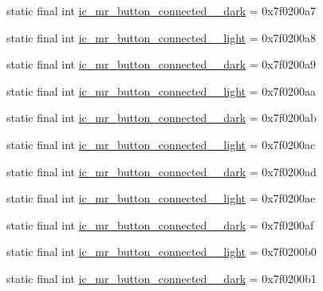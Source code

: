 \begin{CompactItemize}
\item 
static final int \hyperlink{classandroid_1_1support_1_1v7_1_1recyclerview_1_1_r_1_1drawable_499abbf786df938d6fa821ca68df2c3b}{ic\_\-mr\_\-button\_\-connected\_\_\-dark} = 0x7f0200a7
\item 
static final int \hyperlink{classandroid_1_1support_1_1v7_1_1recyclerview_1_1_r_1_1drawable_ec6d9b101cf9909231258707a5fa4ee5}{ic\_\-mr\_\-button\_\-connected\_\_\-light} = 0x7f0200a8
\item 
static final int \hyperlink{classandroid_1_1support_1_1v7_1_1recyclerview_1_1_r_1_1drawable_d05229da8974e09ac5083b489d43a212}{ic\_\-mr\_\-button\_\-connected\_\_\-dark} = 0x7f0200a9
\item 
static final int \hyperlink{classandroid_1_1support_1_1v7_1_1recyclerview_1_1_r_1_1drawable_901356fae4838928b40b6b1602799e2d}{ic\_\-mr\_\-button\_\-connected\_\_\-light} = 0x7f0200aa
\item 
static final int \hyperlink{classandroid_1_1support_1_1v7_1_1recyclerview_1_1_r_1_1drawable_604678156534031bf7d3edab3e25043d}{ic\_\-mr\_\-button\_\-connected\_\_\-dark} = 0x7f0200ab
\item 
static final int \hyperlink{classandroid_1_1support_1_1v7_1_1recyclerview_1_1_r_1_1drawable_93e54ad30ef4260555206bf53ea8a0e2}{ic\_\-mr\_\-button\_\-connected\_\_\-light} = 0x7f0200ac
\item 
static final int \hyperlink{classandroid_1_1support_1_1v7_1_1recyclerview_1_1_r_1_1drawable_0f5a54c803ff127dc94ce959f68b760e}{ic\_\-mr\_\-button\_\-connected\_\_\-dark} = 0x7f0200ad
\item 
static final int \hyperlink{classandroid_1_1support_1_1v7_1_1recyclerview_1_1_r_1_1drawable_62dac025d303ce32038a9a6496a6408c}{ic\_\-mr\_\-button\_\-connected\_\_\-light} = 0x7f0200ae
\item 
static final int \hyperlink{classandroid_1_1support_1_1v7_1_1recyclerview_1_1_r_1_1drawable_1cb571454bb4b3d863a93be1139dcf5f}{ic\_\-mr\_\-button\_\-connected\_\_\-dark} = 0x7f0200af
\item 
static final int \hyperlink{classandroid_1_1support_1_1v7_1_1recyclerview_1_1_r_1_1drawable_b48440454ca10cf8358e8ebdd7630768}{ic\_\-mr\_\-button\_\-connected\_\_\-light} = 0x7f0200b0
\item 
static final int \hyperlink{classandroid_1_1support_1_1v7_1_1recyclerview_1_1_r_1_1drawable_8e6295db34a40a5623ab6cf96ece47e5}{ic\_\-mr\_\-button\_\-connected\_\_\-dark} = 0x7f0200b1
\item 

\end{CompactItemize}
